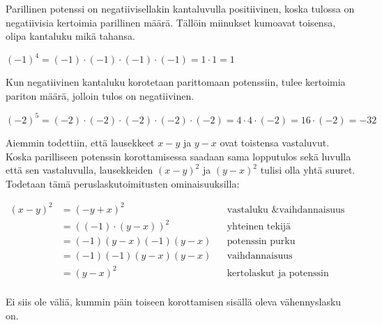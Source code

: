 Parillinen potenssi on negatiivisellakin kantaluvulla positiivinen, koska tulossa on negatiivisia kertoimia parillinen määrä. Tällöin miinukset kumoavat toisensa, olipa kantaluku mikä tahansa.

\begin{esimerkki}
$(-1)^4=(-1) \cdot (-1) \cdot (-1) \cdot (-1)= 1\cdot 1=1$
\end{esimerkki}

Kun negatiivinen kantaluku korotetaan parittomaan potenssiin, tulee kertoimia pariton määrä, jolloin tulos on negatiivinen.

\begin{esimerkki}
$(-2)^5=(-2) \cdot (-2) \cdot (-2) \cdot (-2) \cdot (-2)=4\cdot4\cdot(-2)=16\cdot(-2)= -32$
\end{esimerkki}

\begin{esimerkki}
Aiemmin todettiin, että lausekkeet $x-y$ ja $y-x$ ovat toistensa vastaluvut. Koska parilliseen potenssin korottamisessa saadaan sama lopputulos sekä luvulla että sen vastaluvulla, lausekkeiden $(x-y)^2$ ja $(y-x)^2$ tulisi olla yhtä suuret. Todetaan tämä peruslaskutoimitusten ominaisuuksilla:

\begin{align*}
(x-y)^2&=(-y+x)^2 && \text{vastaluku \& vaihdannaisuus} \\
&=\left((-1)\cdot(y-x) \right)^2 && \text{yhteinen tekijä} \\
&=(-1)(y-x)(-1)(y-x) && \text{potenssin purku} \\
&=(-1)(-1)(y-x)(y-x) && \text{vaihdannaisuus} \\
&=(y-x)^2 && \text{kertolaskut ja potenssin määritelmä} \\
\end{align*}

Ei siis ole väliä, kummin päin toiseen korottamisen sisällä oleva vähennyslasku on.

\end{esimerkki}
%
